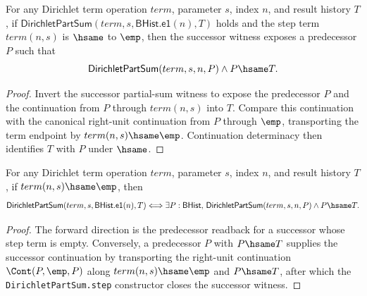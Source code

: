 \begin{theorem}
\label{thm:lfunction-dirichlet-part-sum-successor-zero-term-previous-result-same}
For any Dirichlet term operation $term$, parameter $s$, index $n$, and result
history $T$, if
$\mathsf{DirichletPartSum}(term,s,\mathsf{BHist.e1}(n),T)$ holds and the
step term $term(n,s)$ is $\hsame$ to $\emp$, then the successor witness exposes
a predecessor $P$ such that
$$
\mathsf{DirichletPartSum}(term,s,n,P)\land P\hsame T.
$$
\end{theorem}
\begin{proof}
Invert the successor partial-sum witness to expose the predecessor $P$ and the
continuation from $P$ through $term(n,s)$ into $T$. Compare this continuation
with the canonical right-unit continuation from $P$ through $\emp$, transporting
the term endpoint by $term(n,s)\hsame\emp$. Continuation determinacy then
identifies $T$ with $P$ under $\hsame$.
\end{proof}

\begin{theorem}
\label{thm:lfunction-dirichlet-partsum-successor-zero-term-result-iff}
For any Dirichlet term operation $term$, parameter $s$, index $n$, and result
history $T$, if $term(n,s)\hsame\emp$, then
$$
\mathsf{DirichletPartSum}(term,s,\mathsf{BHist.e1}(n),T)
\Longleftrightarrow
\exists P:\mathsf{BHist},\,
\mathsf{DirichletPartSum}(term,s,n,P)\land P\hsame T.
$$
\end{theorem}
\begin{proof}
The forward direction is the predecessor readback for a successor whose step
term is empty. Conversely, a predecessor $P$ with $P\hsame T$ supplies the
successor continuation by transporting the right-unit continuation
$\Cont(P,\emp,P)$ along $term(n,s)\hsame\emp$ and $P\hsame T$, after which the
\texttt{DirichletPartSum.step} constructor closes the successor witness.
\end{proof}

